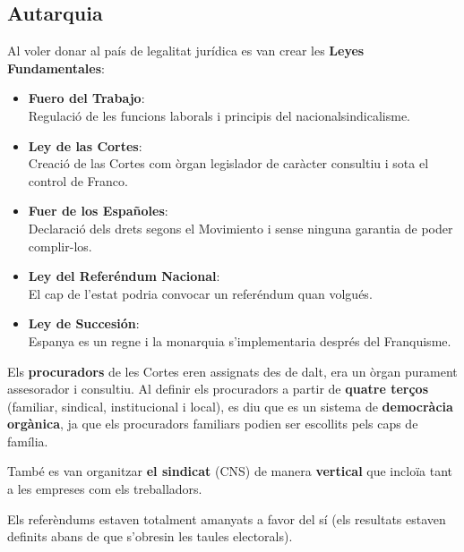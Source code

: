 \documentclass[arial,a4paper,print]{article}
\begin{document}
\subsection{Autarquia}
Al voler donar al país de legalitat jurídica es van crear les \textbf{Leyes Fundamentales}:
\begin{itemize}
\item \textbf{Fuero del Trabajo}:\\
Regulació de les funcions laborals i principis del nacionalsindicalisme.

\item \textbf{Ley de las Cortes}:\\
Creació de las Cortes com òrgan legislador de caràcter consultiu i sota el control de Franco. 

\item \textbf{Fuer de los Españoles}:\\
Declaració dels drets segons el Movimiento i sense ninguna garantia de poder complir-los. 

\item \textbf{Ley del Referéndum Nacional}:\\
El cap de l'estat podria convocar un referéndum quan volgués. 

\item \textbf{Ley de Succesión}:\\
Espanya es un regne i la monarquia s'implementaria després del Franquisme. 
\end{itemize}

Els \textbf{procuradors} de les Cortes eren assignats des de dalt, era un òrgan purament assesorador i consultiu. Al definir els procuradors a partir de \textbf{quatre terços} (familiar, sindical, institucional i local), es diu que es un sistema de \textbf{democràcia orgànica}, ja que els procuradors familiars podien ser escollits pels caps de família. 

També es van organitzar \textbf{el sindicat} (CNS) de manera \textbf{vertical} que incloïa tant a les empreses com els treballadors.  

Els referèndums estaven totalment amanyats a favor del sí (els resultats estaven definits abans de que s'obresin les taules electorals). 

\pagebreak
\end{document}
